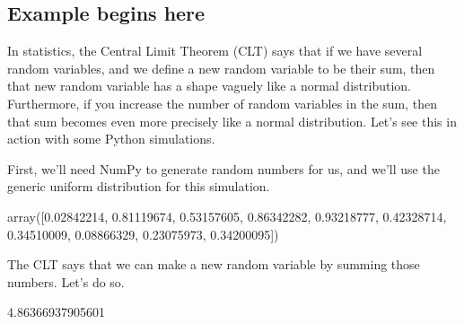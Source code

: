 \documentclass[letterpaper,10pt,english]{jupyterBook}
\begin{document}
\subsection{Example begins here}
\label{\detokenize{chapter-14-dashboards:example-begins-here}}
\sphinxAtStartPar
In statistics, the Central Limit Theorem (CLT) says that if we have several random variables, and we define a new random variable to be their sum, then that new random variable has a shape vaguely like a normal distribution.  Furthermore, if you increase the number of random variables in the sum, then that sum becomes even more precisely like a normal distribution.  Let’s see this in action with some Python simulations.

\sphinxAtStartPar
First, we’ll need NumPy to generate random numbers for us, and we’ll use the generic uniform distribution for this simulation.

\begin{sphinxVerbatim}[commandchars=\\\{\}]
   
    
\end{sphinxVerbatim}

\begin{sphinxVerbatim}[commandchars=\\\{\}]
array([0.02842214, 0.81119674, 0.53157605, 0.86342282, 0.93218777,
       0.42328714, 0.34510009, 0.08866329, 0.23075973, 0.34200095])
\end{sphinxVerbatim}

\sphinxAtStartPar
The CLT says that we can make a new random variable by summing those numbers.  Let’s do so.

\begin{sphinxVerbatim}[commandchars=\\\{\}]
  
       

  
\end{sphinxVerbatim}

\begin{sphinxVerbatim}[commandchars=\\\{\}]
4.86366937905601
\end{sphinxVerbatim}
\end{document}
